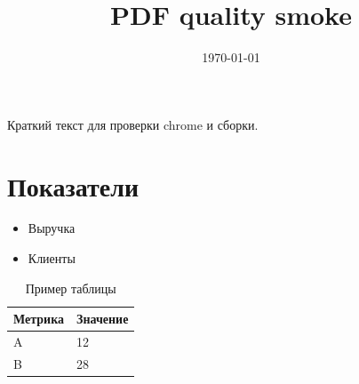 \documentclass[a4paper,12pt]{article}
\title{PDF quality smoke}
\author{}
\date{\today}
\begin{document}
\maketitle

Краткий текст для проверки chrome и сборки.

\section{Показатели}
\begin{itemize}
  \item Выручка
  \item Клиенты
\end{itemize}

\begin{table}[H]
\centering
\begin{tabular}{ll}
\toprule
Метрика & Значение \\
\midrule
A & 12 \\
B & 28 \\
\bottomrule
\end{tabular}
\caption{Пример таблицы}
\end{table}
\end{document}

